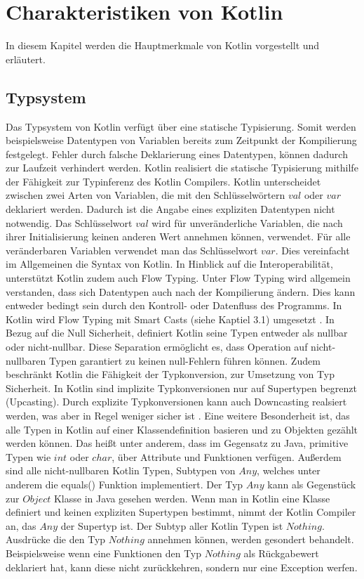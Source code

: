 \documentclass{article}
\begin{document}
\section{Charakteristiken von Kotlin}
In diesem Kapitel werden die Hauptmerkmale von Kotlin vorgestellt und erläutert.
\subsection{Typsystem}
Das Typsystem von Kotlin verfügt über eine statische Typisierung. Somit werden beispielsweise Datentypen von Variablen bereits zum Zeitpunkt der Kompilierung festgelegt. Fehler durch falsche Deklarierung eines Datentypen, können dadurch zur Laufzeit verhindert werden. Kotlin realisiert die statische Typisierung mithilfe der Fähigkeit zur Typinferenz des Kotlin Compilers. Kotlin unterscheidet zwischen zwei Arten von Variablen, die mit den Schlüsselwörtern $val$ oder $var$ deklariert werden.  Dadurch ist die Angabe eines expliziten Datentypen nicht notwendig. Das Schlüsselwort $val$ wird für unveränderliche Variablen, die nach ihrer Initialisierung keinen anderen Wert annehmen können, verwendet. Für alle veränderbaren Variablen verwendet man das Schlüsselwort $var$. Dies vereinfacht im Allgemeinen die Syntax von Kotlin. In Hinblick auf die Interoperabilität, unterstützt Kotlin zudem auch Flow Typing. Unter Flow Typing wird allgemein verstanden, dass sich Datentypen auch nach der Kompilierung ändern. Dies kann entweder bedingt sein durch den Kontroll- oder Datenfluss des Programms. In Kotlin wird Flow Typing mit Smart Casts (siehe Kaptiel 3.1) umgesetzt \cite{KotlinLangSpec}. \newline
In Bezug auf die Null Sicherheit, definiert Kotlin seine Typen entweder als nullbar oder nicht-nullbar. Diese Separation ermöglicht es, dass Operation auf nicht-nullbaren Typen garantiert zu keinen null-Fehlern führen können. Zudem beschränkt Kotlin die Fähigkeit der Typkonversion, zur Umsetzung von Typ Sicherheit. In Kotlin sind implizite Typkonversionen nur auf Supertypen begrenzt (Upcasting). Durch explizite Typkonversionen kann auch Downcasting realsiert werden, was aber in Regel weniger sicher ist \cite{KotlinLangSpec}.\newline
Eine weitere Besonderheit ist, das alle Typen in Kotlin auf einer Klassendefinition basieren und zu Objekten gezählt werden können. Das heißt unter anderem, dass im Gegensatz zu Java, primitive Typen wie $int$ oder $char$, über Attribute und Funktionen verfügen. Außerdem sind alle nicht-nullbaren Kotlin Typen, Subtypen von $Any$, welches unter anderem die equals() Funktion implementiert. Der Typ $Any$ kann als Gegenstück zur $Object$ Klasse in Java gesehen werden. Wenn man in Kotlin eine Klasse definiert und keinen expliziten Supertypen bestimmt, nimmt der Kotlin Compiler an, das $Any$ der Supertyp ist. Der Subtyp aller Kotlin Typen ist $Nothing$. Ausdrücke die den Typ $Nothing$ annehmen können, werden gesondert behandelt. Beispielsweise wenn eine Funktionen den Typ $Nothing$ als Rückgabewert deklariert hat, kann diese nicht zurückkehren, sondern nur eine Exception werfen. \cite{KotlinLangSpec}
\end{document}
